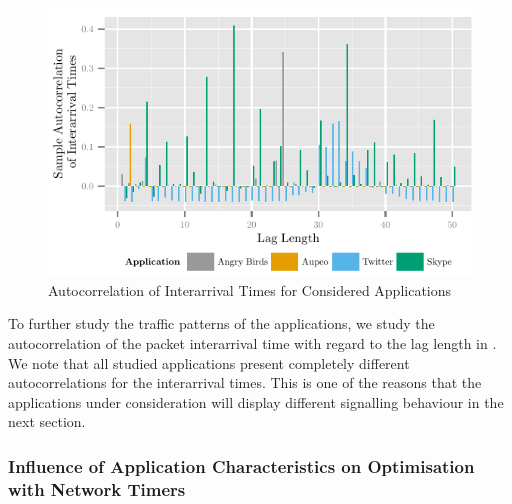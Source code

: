 \begin{figure}
\centering
\includegraphics{network/network_traces/numerical_results/figures/autocorrelation}
\caption{Autocorrelation of Interarrival Times for Considered Applications}\label{fig:network:network_traces:numerical_results:traffic:autocorrelation}
\end{figure}

To further study the traffic patterns of the applications, we study the autocorrelation of the packet interarrival time with regard to the lag length in .
We note that all studied applications present completely different autocorrelations for the interarrival times.
This is one of the reasons that the applications under consideration will display different signalling behaviour in the next section.

\subsubsection*{Influence of Application Characteristics on Optimisation with Network Timers}\label{sec:network:network_traces:numerical_results:application_influence}

